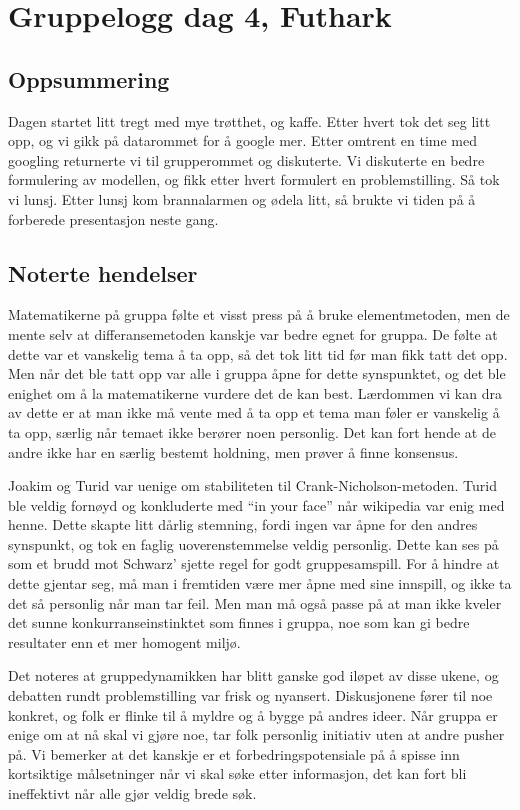 \documentclass[a4paper, norsk, 12pt]{report}
\begin{document}
\chapter*{Gruppelogg dag 4, Futhark}

\section*{Oppsummering}
Dagen startet litt tregt med mye trøtthet, og kaffe. Etter hvert tok det seg
litt opp, og vi gikk på datarommet for å google mer. Etter omtrent en time med
googling returnerte vi til grupperommet og diskuterte. Vi diskuterte en bedre
formulering av modellen, og fikk etter hvert formulert en problemstilling. Så
tok vi lunsj. Etter lunsj kom brannalarmen og ødela litt, så brukte vi tiden på
å forberede presentasjon neste gang.

\section*{Noterte hendelser}
Matematikerne på gruppa følte et visst press på å bruke elementmetoden, men de
mente selv at differansemetoden kanskje var bedre egnet for gruppa. De følte at dette var
et vanskelig tema å ta opp, så det tok litt tid før man fikk tatt det opp. Men
når det ble tatt opp var alle i gruppa åpne for dette synspunktet, og det ble
enighet om å la matematikerne vurdere det de kan best. Lærdommen vi kan dra av
dette er at man ikke må vente med å ta opp et tema man føler er vanskelig å ta
opp, særlig når temaet ikke berører noen personlig. Det kan fort hende at de
andre ikke har en særlig bestemt holdning, men prøver å finne konsensus.

Joakim og Turid var uenige om stabiliteten til Crank-Nicholson-metoden. Turid
ble veldig fornøyd og konkluderte med ``in your face'' når wikipedia var enig
med henne. Dette skapte litt dårlig stemning, fordi ingen var åpne for den
andres synspunkt, og tok en faglig uoverenstemmelse veldig personlig. Dette kan
ses på som et brudd mot Schwarz' sjette regel for godt gruppesamspill. For å hindre
at dette gjentar seg, må man i fremtiden være mer åpne med sine innspill, og ikke 
ta det så personlig når man tar feil. Men man må også passe på at man ikke
kveler det sunne konkurranseinstinktet som finnes i gruppa, noe som kan gi bedre
resultater enn et mer homogent miljø.

Det noteres at gruppedynamikken har blitt ganske god iløpet av disse ukene, og
debatten rundt problemstilling var frisk og nyansert. Diskusjonene fører til noe
konkret, og folk er flinke til å myldre og å bygge på andres ideer. Når gruppa
er enige om at nå skal vi gjøre noe, tar folk personlig initiativ uten at andre
pusher på. Vi bemerker at det kanskje er et forbedringspotensiale på å spisse
inn kortsiktige målsetninger når vi skal søke etter informasjon, det kan
fort bli ineffektivt når alle gjør veldig brede søk.
\end{document}

